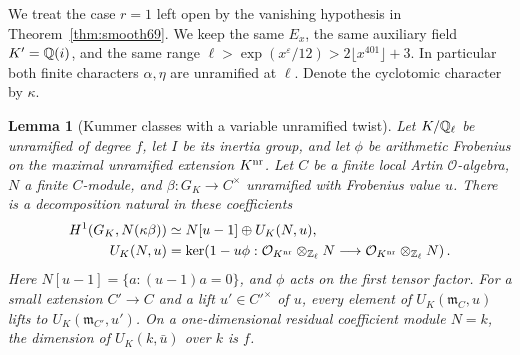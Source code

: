 \documentclass[a4paper,11pt]{article}
\newtheorem{lemma}[proposition]{Lemma}
\theoremstyle{definition}
\theoremstyle{remark}
\newcommand{\ZZ}{\mathbb Z}\newcommand{\ord}{\operatorname{ord}}
\numberwithin{equation}{section}
\newcommand{\OO}{\mathcal O}
\begin{document}
We treat the case \(r=1\) left open by the vanishing hypothesis in
Theorem~\ref{thm:smooth69}. We keep the same \(E_x\), the same
auxiliary field \(K'=\mathbb Q(i)\), and the same range
\(\ell>\exp(x^\varepsilon/12)>2\lfloor x^{401}\rfloor+3\).
In particular both finite characters \(\alpha,\eta\) are unramified
at \(\ell\). Denote the cyclotomic character by \(\kappa\).

\begin{lemma}[Kummer classes with a variable unramified twist]\label{lem:kummer72}
Let \(K/\mathbb Q_\ell\) be unramified of degree \(f\), let \(I\) be its
inertia group, and let \(\phi\) be arithmetic Frobenius on the
maximal unramified extension \(K^{\rm nr}\). Let \(C\) be a finite
local Artin \(\OO\)-algebra, \(N\) a finite \(C\)-module, and
\(\beta:G_K\to C^\times\) unramified with Frobenius value \(u\).
There is a decomposition natural in these coefficients
\begin{align}
 H^1(G_K,N(\kappa\beta)) &\simeq N[u-1]\oplus U_K(N,u),
                                                        \label{eq:kummer72}\\
 U_K(N,u)&=\ker\!\left(1-u\phi:
    \mathcal O_{K^{\rm nr}}\otimes_{\ZZ_\ell}N\longrightarrow
    \mathcal O_{K^{\rm nr}}\otimes_{\ZZ_\ell}N\right). \notag
\end{align}
Here \(N[u-1]=\{a:(u-1)a=0\}\), and \(\phi\) acts on the first
tensor factor. For a small extension \(C'\to C\) and a lift
\(u'\in C'^\times\) of \(u\), every element of
\(U_K(\mathfrak m_C,u)\) lifts to
\(U_K(\mathfrak m_{C'},u')\). On a one-dimensional residual
coefficient module \(N=k\), the dimension of \(U_K(k,\bar u)\)
over \(k\) is \(f\).
\end{lemma}
\end{document}
